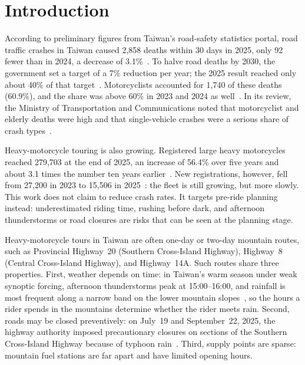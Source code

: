 \section{Introduction}
\label{sec:intro}

According to preliminary figures from Taiwan's road-safety statistics portal, road traffic crashes in Taiwan caused 2,858 deaths within 30 days in 2025, only 92 fewer than in 2024, a decrease of 3.1\%~\cite{roadsafety2026}. To halve road deaths by 2030, the government set a target of a 7\% reduction per year; the 2025 result reached only about 40\% of that target~\cite{hu2026udn}. Motorcyclists accounted for 1,740 of these deaths (60.9\%), and the share was above 60\% in 2023 and 2024 as well~\cite{roadsafety2026}. In its review, the Ministry of Transportation and Communications noted that motorcyclist and elderly deaths were high and that single-vehicle crashes were a serious share of crash types~\cite{udn2026drop,tvbs2026}.

Heavy-motorcycle touring is also growing. Registered large heavy motorcycles reached 279,703 at the end of 2025, an increase of 56.4\% over five years and about 3.1 times the number ten years earlier~\cite{thb2026}. New registrations, however, fell from 27,200 in 2023 to 15,506 in 2025~\cite{thb2026}: the fleet is still growing, but more slowly. This work does not claim to reduce crash rates. It targets pre-ride planning instead: underestimated riding time, rushing before dark, and afternoon thunderstorms or road closures are risks that can be seen at the planning stage.

Heavy-motorcycle tours in Taiwan are often one-day or two-day mountain routes, such as Provincial Highway~20 (Southern Cross-Island Highway), Highway~8 (Central Cross-Island Highway), and Highway~14A. Such routes share three properties. First, weather depends on time: in Taiwan's warm season under weak synoptic forcing, afternoon thunderstorms peak at 15:00--16:00, and rainfall is most frequent along a narrow band on the lower mountain slopes~\cite{lin2011thunderstorm}, so the hours a rider spends in the mountains determine whether the rider meets rain. Second, roads may be closed preventively: on July~19 and September~22, 2025, the highway authority imposed precautionary closures on sections of the Southern Cross-Island Highway because of typhoon rain~\cite{cna2025jul,cna2025sep}. Third, supply points are sparse: mountain fuel stations are far apart and have limited opening hours.

